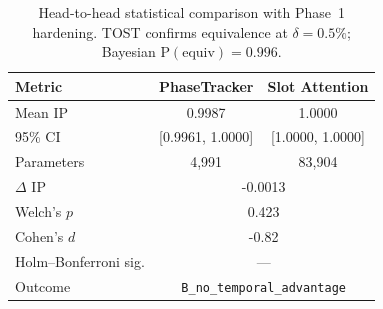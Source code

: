 \begin{table}[t]
\centering
\caption{Head-to-head statistical comparison with Phase~1 hardening. TOST confirms equivalence at $\delta=0.5\%$; Bayesian $\mathrm{P(equiv)}=0.996$.}
\label{tab:statistical}
\begin{tabular}{lcc}
\toprule
Metric & PhaseTracker & Slot Attention \\
\midrule
Mean IP & 0.9987 & 1.0000 \\
95\% CI & [0.9961, 1.0000] & [1.0000, 1.0000] \\
Parameters & 4,991 & 83,904 \\
\midrule
$\Delta$ IP & \multicolumn{2}{c}{-0.0013} \\
Welch's $p$ & \multicolumn{2}{c}{0.423} \\
Cohen's $d$ & \multicolumn{2}{c}{-0.82} \\
Holm--Bonferroni sig. & \multicolumn{2}{c}{---} \\
Outcome & \multicolumn{2}{c}{\texttt{B\_no\_temporal\_advantage}} \\
\bottomrule
\end{tabular}
\end{table}
